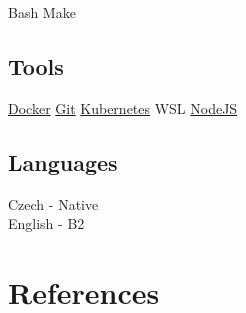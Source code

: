 \documentclass[a4paper,final]{styles/deedy-resume}%
\newcommand{\mySep}{{\color{black!40!white}\textbullet{}}}
\newcommand{\mySmallSpace}{\vspace{3pt}}
\begin{document}
\begin{minipage}[t]{0.33\textwidth}
	{\small
		Bash \mySep{}
		Make
		\mySmallSpace{}
	}

	\sectionspace %

	\subsection{Tools}
	{\small
		\href{https://www.docker.com/}{Docker} \mySep{}
		\href{https://git-scm.com/}{Git} \mySep{}
		\href{https://kubernetes.io/}{Kubernetes} \mySep{}
		WSL \mySep{}
		\href{https://nodejs.org/en}{NodeJS}
		\mySmallSpace{}
	}

	\sectionspace %

	\subsection{Languages}
	{\small
		Czech - Native
		\\
		English - B2
		\mySmallSpace{}
	}

	\section{References}

	\href{https://github.com/rajzik}{}

	\sectionspace %



\end{minipage} %
\hfill
%
%
\end{document}
